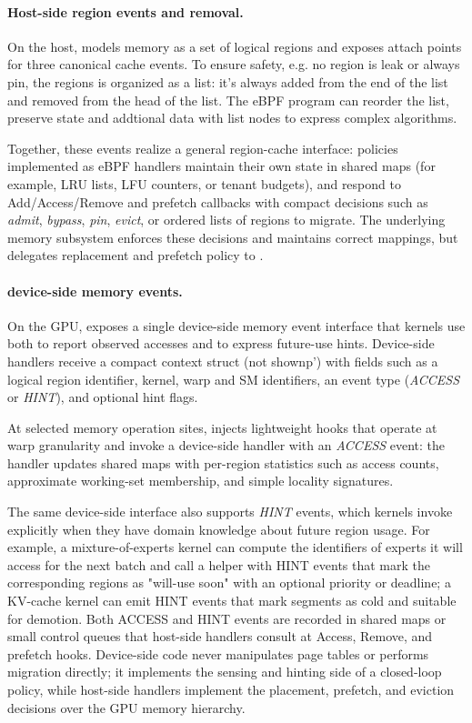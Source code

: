 \paragraph{Host-side region events and removal.}
On the host, \sys models memory as a set of logical regions and exposes attach points for three
canonical cache events. To ensure safety, e.g. no region is leak or always pin, the regions is organized as a list: it's always added from the end of the list and removed from the head of the list. The eBPF program can reorder the list, preserve state and addtional data with list nodes to express complex algorithms.

Together, these events realize a
general region-cache interface: policies implemented as eBPF handlers maintain their
own state in shared maps (for example, LRU lists, LFU counters, or tenant budgets),
and respond to Add/Access/Remove and prefetch callbacks with compact decisions
such as \emph{admit}, \emph{bypass}, \emph{pin}, \emph{evict}, or ordered lists
of regions to migrate. The underlying memory subsystem enforces these decisions
and maintains correct mappings, but delegates replacement and prefetch policy to
\sys.

\paragraph{device-side memory events.}

On the GPU, \sys exposes a single device-side memory event interface that kernels
use both to report observed accesses and to express future-use hints. Device-side
handlers receive a compact context struct (not shownp') with fields such as a logical
region identifier, kernel, warp and SM identifiers, an event type (\emph{ACCESS}
or \emph{HINT}), and optional hint flags.

At selected memory operation sites, \sys injects lightweight hooks that operate at
warp granularity and invoke a device-side \sys handler with an \emph{ACCESS} event:
the handler updates shared maps with per-region statistics such as access counts,
approximate working-set membership, and simple locality signatures.\

The same device-side interface also supports \emph{HINT} events, which kernels
invoke explicitly when they have domain knowledge about future region usage. For
example, a mixture-of-experts kernel can compute the identifiers of experts it
will access for the next batch and call a \sys helper with HINT events that mark
the corresponding regions as "will-use soon" with an optional priority or deadline;
a KV-cache kernel can emit HINT events that mark segments as cold and suitable for
demotion. Both ACCESS and HINT events are recorded in shared maps or small control
queues that host-side \sys handlers consult at Access, Remove, and prefetch hooks.
Device-side code never manipulates page tables or performs migration directly; it
implements the sensing and hinting side of a closed-loop policy, while host-side
\sys handlers implement the placement, prefetch, and eviction decisions over the
GPU memory hierarchy.


